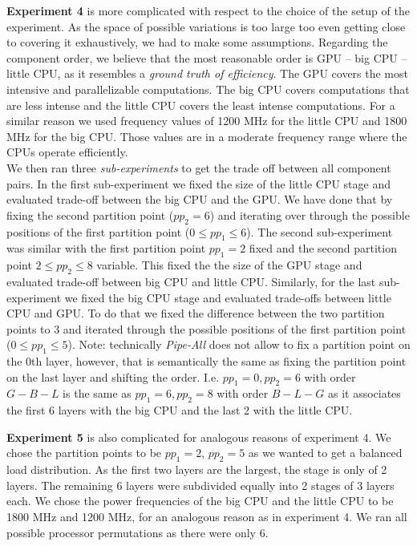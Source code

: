 \documentclass{uva-inf-article}
\begin{document}
\textbf{Experiment 4} is more complicated with respect to the choice of the setup of the experiment. As the space of possible variations is too large too even getting close to covering it exhaustively, we had to make some assumptions. 
Regarding the component order, we believe that the most reasonable order is GPU -- big CPU -- little CPU, as it resembles a {\em ground truth of efficiency}. The GPU covers the most intensive and parallelizable computations. The big CPU covers computations that are less intense and the little CPU covers the least intense computations. %
For a similar reason we used frequency values of 1200 MHz for the little CPU and 1800 MHz for the big CPU. Those values are in a moderate frequency range where the CPUs operate efficiently. \\
We then ran three {\em sub-experiments} to get the trade off between all component pairs. In the first sub-experiment we fixed the size of the little CPU stage and evaluated trade-off between the big CPU and the GPU. We have done that by fixing the second partition point ($pp_2 = 6$) and iterating over through the possible positions of the first partition point ($0 \leq pp_1 \leq 6$). The second sub-experiment was similar with the first partition point $pp_1=2$ fixed and the second partition point $2 \leq pp_2 \leq 8$ variable. This fixed the the size of the GPU stage and evaluated trade-off between big CPU and little CPU. Similarly, for the last sub-experiment we fixed the big CPU stage and evaluated trade-offs between little CPU and GPU. To do that we fixed the difference between the two partition points to 3 and iterated through the possible positions of the first partition point ($0 \leq pp_1 \leq 5$).
Note: technically {\em Pipe-All} does not allow to fix a partition point on the 0th layer, however, that is semantically the same as fixing the partition point on the last layer and shifting the order. I.e. $pp_1=0, pp_2=6$ with order $G-B-L$ is the same as $pp_1=6, pp_2=8$ with order $B-L-G$ as it associates the first 6 layers with the big CPU and the last 2 with the little CPU.


\textbf{Experiment 5} is also complicated for analogous reasons of experiment 4. We chose the partition points to be $pp_1=2$, $pp_2=5$ as we wanted to get a balanced load distribution. As the first two layers are the largest, the stage is only of 2 layers. The remaining 6 layers were subdivided equally into 2 stages of 3 layers each. We chose the power frequencies of the big CPU and the little CPU to be 1800 MHz and 1200 MHz, for an analogous reason as in experiment 4. We ran all possible processor permutations as there were only 6. 
\end{document}
